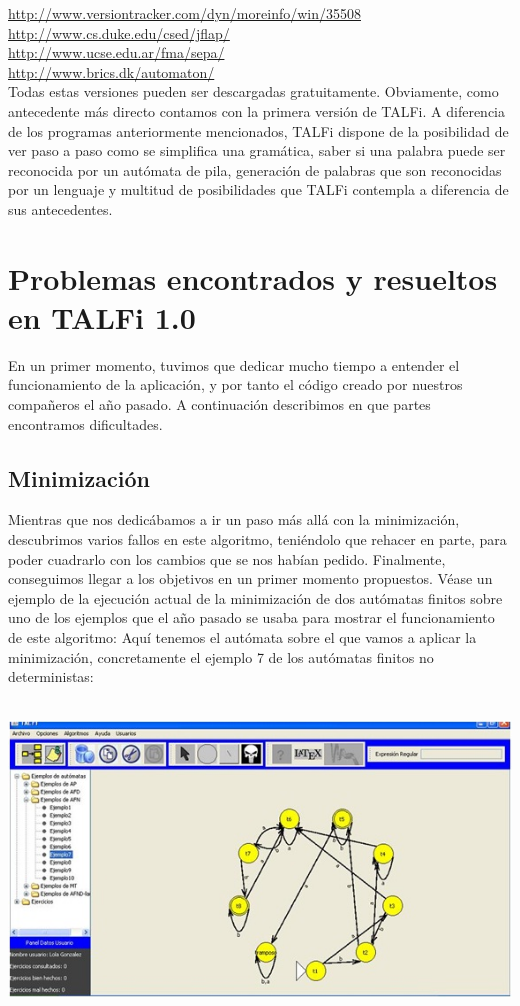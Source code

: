 \documentclass[12pt,a4paper,spanish]{book}
\begin{document}
\url{http://www.versiontracker.com/dyn/moreinfo/win/35508} \\
\url{http://www.cs.duke.edu/csed/jflap/} \\
\url{http://www.ucse.edu.ar/fma/sepa/} \\
\url{http://www.brics.dk/automaton/} \\

Todas estas versiones pueden ser descargadas gratuitamente.
Obviamente, como antecedente m\'as directo contamos con la primera versi\'on de TALFi.
A diferencia de los programas anteriormente mencionados, TALFi dispone de la posibilidad de ver paso a paso como se simplifica una gram\'atica, saber si una palabra puede ser reconocida por un aut\'omata de pila, generaci\'on de palabras que son reconocidas por un lenguaje y multitud de posibilidades que TALFi contempla a diferencia de sus antecedentes.

\section{Problemas encontrados y resueltos en TALFi 1.0}
En un primer momento, tuvimos que dedicar mucho tiempo a entender el funcionamiento de la aplicaci\'on, y por tanto el c\'odigo creado por nuestros compa\~neros el a\~no pasado. A continuaci\'on describimos en que partes encontramos dificultades.
\subsection{Minimizaci\'on}
 Mientras que nos dedic\'abamos a ir un paso m\'as all\'a con la minimizaci\'on, descubrimos varios fallos en este algoritmo, teni\'endolo que rehacer en parte, para poder cuadrarlo con los cambios que se nos hab\'ian pedido. Finalmente, conseguimos llegar a los objetivos en un primer momento propuestos. V\'ease un ejemplo de la ejecuci\'on actual de la minimizaci\'on de dos aut\'omatas finitos sobre uno de los ejemplos que el a\~no pasado se usaba para mostrar el funcionamiento de este algoritmo:
Aqu\'i tenemos el aut\'omata sobre el que vamos a aplicar la minimizaci\'on, concretamente el ejemplo 7 de los aut\'omatas finitos no deterministas:
\\
\\
\begin{center}
\includegraphics{auto1.jpg}
\end{center}
\end{document}
